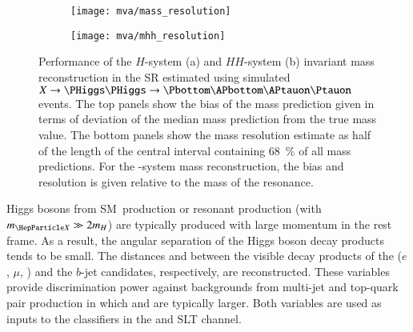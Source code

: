 


\begin{figure}[htbp]
  \centering

  \begin{subfigure}[t]{.45\textwidth}
    \centering
    \texttt{[image: mva/mass\_resolution]}
    \label{fig:mass_reconstruction_H}
  \end{subfigure}\hspace*{0.05\textwidth}%
  \begin{subfigure}[t]{.45\textwidth}
    \centering
    \texttt{[image: mva/mhh\_resolution]}
    \label{fig:mass_reconstruction_HH}
  \end{subfigure}%

  \caption[Performance of the $H$-system and $HH$-system invariant mass
  reconstruction in the \hadhad SR.]{Performance of the $H$-system (a) and
    $HH$-system (b) invariant mass reconstruction in the \hadhad SR estimated
    using simulated $X \to \HH \to \bbtautau$ events.  The top panels show the
    bias of the mass prediction given in terms of deviation of the median mass
    prediction from the true mass value. The bottom panels show the mass
    resolution estimate as half of the length of the central interval containing
    \SI{68}{\percent} of all mass predictions. For the \HH-system mass
    reconstruction, the bias and resolution is given relative to the mass of the
    resonance.}%
  \label{fig:mass_reconstruction}
\end{figure}

Higgs bosons from SM~\HH production or resonant \HH production (with
$\mX \gg 2\mH$) are typically produced with large momentum in the \HH rest
frame. As a result, the angular separation of the Higgs boson decay products
tends to be small. The distances \dRtautau and \dRbb between the visible decay
products of the \tauleptons ($e$, $\mu$, \tauhadvis) and the $b$-jet candidates,
respectively, are reconstructed. These variables provide discrimination power
against backgrounds from multi-jet and top-quark pair production in which
\dRtautau and \dRbb are typically larger. Both variables are used as inputs to
the classifiers in the \hadhad and \lephad SLT channel.

